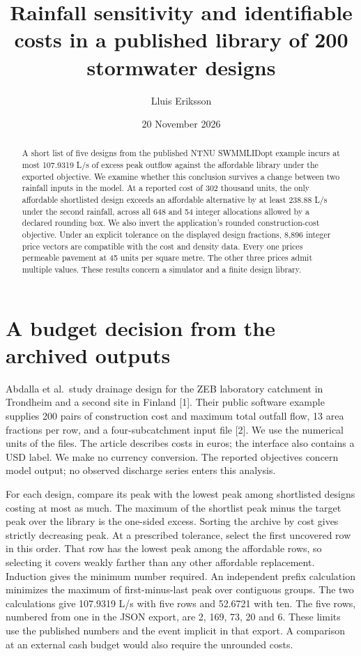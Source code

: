 \documentclass[11pt]{article}
\title{Rainfall sensitivity and identifiable costs in a published library of 200 stormwater designs}
\author{Lluis Eriksson}\date{20 November 2026}
\begin{document}
\maketitle
\begin{abstract}
A short list of five designs from the published NTNU SWMMLIDopt example incurs at most 107.9319 L/s of excess peak outflow against the affordable library under the exported objective. We examine whether this conclusion survives a change between two rainfall inputs in the model. At a reported cost of 302 thousand units, the only affordable shortlisted design exceeds an affordable alternative by at least 238.88 L/s under the second rainfall, across all 648 and 54 integer allocations allowed by a declared rounding box. We also invert the application's rounded construction-cost objective. Under an explicit tolerance on the displayed design fractions, 8,896 integer price vectors are compatible with the cost and density data. Every one prices permeable pavement at 45 units per square metre. The other three prices admit multiple values. These results concern a simulator and a finite design library.
\end{abstract}
\section{A budget decision from the archived outputs}
Abdalla et al.\ study drainage design for the ZEB laboratory catchment in Trondheim and a second site in Finland [1]. Their public software example supplies 200 pairs of construction cost and maximum total outfall flow, 13 area fractions per row, and a four-subcatchment input file [2]. We use the numerical units of the files. The article describes costs in euros; the interface also contains a USD label. We make no currency conversion. The reported objectives concern model output; no observed discharge series enters this analysis.

For each design, compare its peak with the lowest peak among shortlisted designs costing at most as much. The maximum of the shortlist peak minus the target peak over the library is the one-sided excess. Sorting the archive by cost gives strictly decreasing peak. At a prescribed tolerance, select the first uncovered row in this order. That row has the lowest peak among the affordable rows, so selecting it covers weakly farther than any other affordable replacement. Induction gives the minimum number required. An independent prefix calculation minimizes the maximum of first-minus-last peak over contiguous groups. The two calculations give 107.9319 L/s with five rows and 52.6721 with ten. The five rows, numbered from one in the JSON export, are 2, 169, 73, 20 and 6. These limits use the published numbers and the event implicit in that export. A comparison at an external cash budget would also require the unrounded costs.
\end{document}
